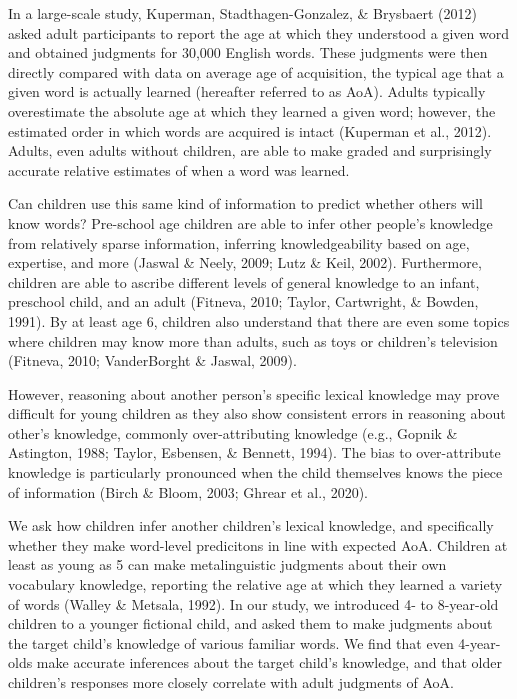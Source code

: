 \documentclass[10pt, letterpaper]{article}
\begin{document}
In a large-scale study, Kuperman, Stadthagen-Gonzalez, \& Brysbaert
(2012) asked adult participants to report the age at which they
understood a given word and obtained judgments for 30,000 English words.
These judgments were then directly compared with data on average age of
acquisition, the typical age that a given word is actually learned
(hereafter referred to as AoA). Adults typically overestimate the
absolute age at which they learned a given word; however, the estimated
order in which words are acquired is intact (Kuperman et al., 2012).
Adults, even adults without children, are able to make graded and
surprisingly accurate relative estimates of when a word was learned.

Can children use this same kind of information to predict whether others
will know words? Pre-school age children are able to infer other
people's knowledge from relatively sparse information, inferring
knowledgeability based on age, expertise, and more (Jaswal \& Neely,
2009; Lutz \& Keil, 2002). Furthermore, children are able to ascribe
different levels of general knowledge to an infant, preschool child, and
an adult (Fitneva, 2010; Taylor, Cartwright, \& Bowden, 1991). By at
least age 6, children also understand that there are even some topics
where children may know more than adults, such as toys or children's
television (Fitneva, 2010; VanderBorght \& Jaswal, 2009).

However, reasoning about another person's specific lexical knowledge may
prove difficult for young children as they also show consistent errors
in reasoning about other's knowledge, commonly over-attributing
knowledge (e.g., Gopnik \& Astington, 1988; Taylor, Esbensen, \&
Bennett, 1994). The bias to over-attribute knowledge is particularly
pronounced when the child themselves knows the piece of information
(Birch \& Bloom, 2003; Ghrear et al., 2020).

We ask how children infer another children's lexical knowledge, and
specifically whether they make word-level predicitons in line with
expected AoA. Children at least as young as 5 can make metalinguistic
judgments about their own vocabulary knowledge, reporting the relative
age at which they learned a variety of words (Walley \& Metsala, 1992).
In our study, we introduced 4- to 8-year-old children to a younger
fictional child, and asked them to make judgments about the target
child's knowledge of various familiar words. We find that even
4-year-olds make accurate inferences about the target child's knowledge,
and that older children's responses more closely correlate with adult
judgments of AoA.
\end{document}
